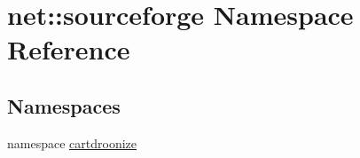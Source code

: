 \hypertarget{namespacenet_1_1sourceforge}{
\section{net::sourceforge Namespace Reference}
\label{namespacenet_1_1sourceforge}
}
\subsection*{Namespaces}
\begin{DoxyCompactItemize}
\item 
namespace \hyperlink{namespacenet_1_1sourceforge_1_1cartdroonize}{cartdroonize}
\end{DoxyCompactItemize}
